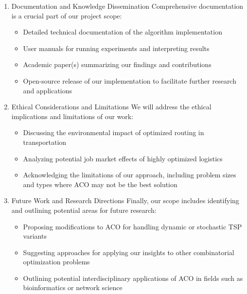 \documentclass[
]{article}
\begin{document}
\begin{enumerate}
  \begin{itemize}
  \item
    Analyzing the convergence properties of our ACO implementation
  \item
    Developing bounds on solution quality and runtime for different
    problem classes
  \item
    Investigating the relationship between problem structure and
    algorithm performance
  \item
    Contributing to the theoretical understanding of
    ACO\textquotesingle s behavior on TSP and related problems
  \end{itemize}
\item
  Documentation and Knowledge Dissemination Comprehensive documentation
  is a crucial part of our project scope:

  \begin{itemize}
  \item
    Detailed technical documentation of the algorithm implementation
  \item
    User manuals for running experiments and interpreting results
  \item
    Academic paper(s) summarizing our findings and contributions
  \item
    Open-source release of our implementation to facilitate further
    research and applications
  \end{itemize}
\item
  Ethical Considerations and Limitations We will address the ethical
  implications and limitations of our work:

  \begin{itemize}
  \item
    Discussing the environmental impact of optimized routing in
    transportation
  \item
    Analyzing potential job market effects of highly optimized logistics
  \item
    Acknowledging the limitations of our approach, including problem
    sizes and types where ACO may not be the best solution
  \end{itemize}
\item
  Future Work and Research Directions Finally, our scope includes
  identifying and outlining potential areas for future research:

  \begin{itemize}
  \item
    Proposing modifications to ACO for handling dynamic or stochastic
    TSP variants
  \item
    Suggesting approaches for applying our insights to other
    combinatorial optimization problems
  \item
    Outlining potential interdisciplinary applications of ACO in fields
    such as bioinformatics or network science
  \end{itemize}
\end{enumerate}
\end{document}
